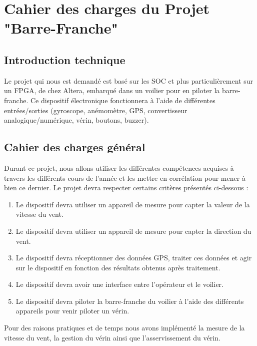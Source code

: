 \section{Cahier des charges du Projet "Barre-Franche"}
\subsection{Introduction technique}
Le projet qui nous est demandé est basé sur les SOC et plus particulièrement sur un FPGA, de chez Altera, embarqué dans un voilier pour en piloter la barre-franche.
\newline
Ce dispositif électronique fonctionnera à l'aide de différentes entrées/sorties (gyroscope, anémomètre, GPS, convertisseur analogique/numérique, vérin, boutons, buzzer).
\subsection{Cahier des charges général}
Durant ce projet, nous allons utiliser les différentes compétences acquises à travers les différents cours de l'année et les mettre en corrélation pour mener à bien ce dernier. Le projet devra respecter certains critères présentés ci-dessous :
\begin{enumerate}
    \item   Le dispositif devra utiliser un appareil de mesure pour capter la valeur de la vitesse du vent.
    \item   Le dispositif devra utiliser un appareil de mesure pour capter la direction du vent.
    \item   Le dispositif devra réceptionner des données GPS, traiter ces données et agir sur le dispositif en fonction des résultats obtenus après traitement.
    \item   Le dispositif devra avoir une interface entre l'opérateur et le voilier.
    \item   Le dispositif devra piloter la barre-franche du voilier à l'aide des différents appareils pour venir piloter un vérin. 
\end{enumerate}
Pour des raisons pratiques et de temps nous avons implémenté la mesure de la vitesse du vent, la gestion du vérin ainsi que l'asservissement du vérin.
\newpage
